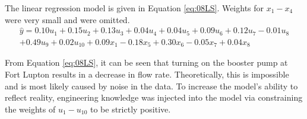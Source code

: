 The linear regression model is given in Equation \ref{eq:08LS}.  Weights for $x_{1} - x_{4}$ were very small and were omitted.
\begin{multline}
    \hat{y} = 0.10u_1 + 0.15u_2 + 0.13u_3 + 0.04u_4 + 0.04u_5 + 0.09u_6 + 0.12u_7 - 0.01u_8 \\
    + 0.49u_9 + 0.02u_{10} + 0.09x_{1} - 0.18x_{5} + 0.30x_{6} - 0.05x_{7} + 0.04x_{8}
    \label{eq:08LS_eq}
\end{multline}

From Equation \ref{eq:08LS}, it can be seen that turning on the booster pump at Fort Lupton results in a decrease in flow rate.  Theoretically, this is impossible and is most likely caused by noise in the data.  To increase the model's ability to reflect reality, engineering knowledge was injected into the model via constraining the weights of $u_1 - u_{10}$ to be strictly positive.

%
%

